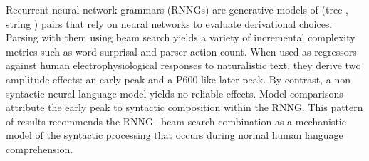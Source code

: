 Recurrent neural network grammars (RNNGs) are generative models of (tree , string ) pairs that rely on neural networks to evaluate derivational choices. Parsing with them using beam search yields a variety of incremental complexity metrics such as word surprisal and parser action count. When used as regressors against human electrophysiological responses to naturalistic text, they derive two amplitude effects: an early peak and a P600-like later peak. By contrast, a non-syntactic neural language model yields no reliable effects. Model comparisons attribute the early peak to syntactic composition within the RNNG. This pattern of results recommends the RNNG+beam search combination as a mechanistic model of the syntactic processing that occurs during normal human language comprehension.
